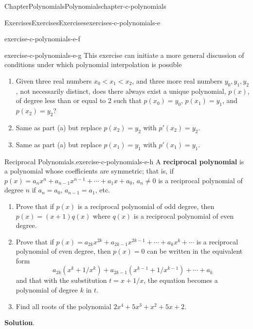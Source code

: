 \documentclass[oneside,10pt,]{book}
\newcommand{\blocktitlefont}{\relax}
\newcommand{\terminology}[1]{\textbf{#1}}
\numberwithin{equation}{section}
\newcommand{\lt}{<}
\begin{document}
\begin{chapterptx}{Chapter}{Polynomials}{}{Polynomials}{}{}{chapter-c-polynomials}
\begin{exercises-section}{Exercises}{Exercises}{}{Exercises}{}{}{exercises-c-polynomials-e}
\begin{divisionexercise}{5}{}{}{exercise-c-polynomials-e-f}
\end{divisionexercise}%
\begin{divisionexercise}{6}{}{}{exercise-c-polynomials-e-g}%
This exercise can initiate a more general discussion of conditions under which polynomial interpolation is possible%
\begin{enumerate}[label=(\alph*)]
\item{}Given three real numbers \(x_0 \lt x_1 \lt x_2\), and three more real numbers \(y_0, y_1, y_2\), not necessarily distinct, does there always exist a unique polynomial, \(p(x)\), of degree less than or equal to 2 such that \(p\left(x_0\right)=y_0\), \(p\left(x_1\right)=y_1\), and \(p\left(x_2\right)=y_2\)?%
\item{}Same as part (a) but replace \(p\left(x_2\right)=y_2\) with \(p'\left(x_2\right)=y_2\).%
\item{}Same as part (a) but replace \(p\left(x_1\right)=y_1\) with \(p'\left(x_1\right)=y_1\).%
\end{enumerate}
%
\end{divisionexercise}%
\begin{divisionexercise}{7}{Reciprocal Polynomials.}{}{exercise-c-polynomials-e-h}%
%
A \terminology{reciprocal polynomial} is a polynomial whose coefficients are symmetric; that is, if \(p(x) = a_n x^n + a_{n-1}x^{n-1}+ \cdots +a_1 x + a_0\), \(a_n \neq 0\) is a reciprocal polynomial of degree \(n\) if \(a_n = a_0\), \(a_{n-1} = a_1\), etc.%
\begin{enumerate}[label=(\alph*)]
\item{}Prove that if \(p(x)\) is a reciprocal polynomial of odd degree, then \(p(x) = (x+1)q(x)\) where \(q(x) \) is a reciprocal polynomial of even degree.%
\item{}Prove that if \(p(x) = a_{2k} x^{2k} + a_{2k-1}x^{2k-1}+ \cdots +a_{k} x^k + \cdots\) is a reciprocal polynomial of even degree, then \(p(x)= 0\) can be written in the equivalent form%
\begin{equation*}
a_{2k} (x^k+1/x^k) + a_{2k-1} (x^{k-1}+1/x^{k-1}) + \cdots +a_{k} 
\end{equation*}
and that with the substitution \(t=x+1/x\), the equation becomes a polynomial of degree \(k\) in \(t\).%
\item{}Find all roots of the polynomial \(2 x^4 + 5 x^3 + x^2 + 5 x + 2\).%
\end{enumerate}
%
\par\smallskip%
\noindent\textbf{\blocktitlefont Solution}.\hypertarget{solution-c-polynomials-e-h-d}{}\quad{}%

\end{divisionexercise}
\end{exercises-section}
\end{chapterptx}
\end{document}
